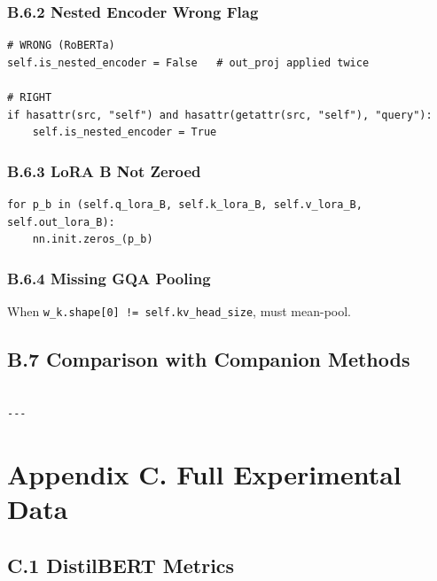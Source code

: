 \subsubsection{B.6.2 Nested Encoder Wrong Flag}

\begin{lstlisting}
# WRONG (RoBERTa)
self.is_nested_encoder = False   # out_proj applied twice

# RIGHT
if hasattr(src, "self") and hasattr(getattr(src, "self"), "query"):
    self.is_nested_encoder = True
\end{lstlisting}

\subsubsection{B.6.3 LoRA B Not Zeroed}

\begin{lstlisting}
for p_b in (self.q_lora_B, self.k_lora_B, self.v_lora_B, self.out_lora_B):
    nn.init.zeros_(p_b)
\end{lstlisting}

\subsubsection{B.6.4 Missing GQA Pooling}

When \texttt{w\_k.shape[0] != self.kv\_head\_size}, must mean-pool.

\subsection{B.7 Comparison with Companion Methods}

\begin{lstlisting}

---
\end{lstlisting}


\section{Appendix C. Full Experimental Data}

\subsection{C.1 DistilBERT Metrics}

